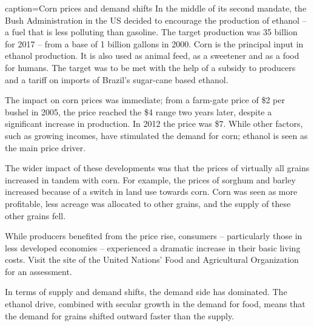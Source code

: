 \newhtmlpage
\newpage

\begin{ApplicationBox}{caption={Corn prices and demand shifts \label{app:cornprice}}}
	In the middle of its second mandate, the Bush Administration in the US decided to encourage the production of ethanol -- a fuel that is less polluting than gasoline. The target production was 35 billion for 2017 -- from a base of 1 billion gallons in 2000. Corn is the principal input in ethanol production. It is also used as animal feed, as a sweetener and as a food for humans. The target was to be met with the help of a subsidy to producers and a tariff on imports of Brazil's sugar-cane based ethanol.
	
	The impact on corn prices was immediate; from a farm-gate price of \$2 per bushel in 2005, the price reached the \$4 range two years later, despite a significant increase in production. In 2012 the price was \$7. While other factors, such as growing incomes, have stimulated the demand for corn; ethanol is seen as the main price driver.
	
	The wider impact of these developments was that the prices of virtually all grains increased in tandem with corn. For example, the prices of sorghum and barley increased because of a switch in land use towards corn. Corn was seen as more profitable, less acreage was allocated to other grains, and the supply of these other grains fell.
	
	While producers benefited from the price rise, consumers -- particularly those in less developed economies -- experienced a dramatic increase in their basic living costs. Visit the site of the United Nations' Food and Agricultural Organization for an assessment.
	
	In terms of supply and demand shifts, the demand side has dominated. The ethanol drive, combined with secular growth in the demand for food, means that the demand for grains shifted outward faster than the supply.
\end{ApplicationBox}